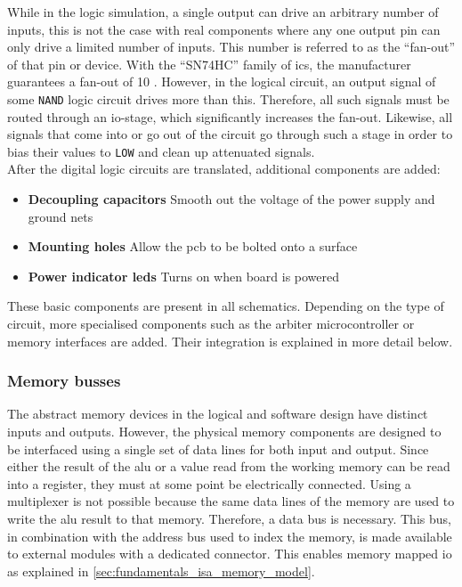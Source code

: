 While in the logic simulation, a single output can drive an arbitrary number of inputs, this is not the case with real components where any one output pin can only drive a limited number of inputs. This number is referred to as the ``fan-out'' of that pin or device. With the ``SN74HC'' family of \acp{ic}, the manufacturer guarantees a fan-out of 10 \cite{ti_sn74hc00}. However, in the logical circuit, an output signal of some \texttt{NAND} logic circuit drives more than this. Therefore, all such signals must be routed through an \ac{io}-stage, which significantly increases the fan-out. Likewise, all signals that come into or go out of the circuit go through such a stage in order to bias their values to \texttt{LOW} and clean up attenuated signals.
\\

After the digital logic circuits are translated, additional components are added:

\begin{itemize}
    \item \textbf{Decoupling capacitors} Smooth out the voltage of the power supply and ground nets
    \item \textbf{Mounting holes} Allow the \ac{pcb} to be bolted onto a surface
    \item \textbf{Power indicator \acp{led}} Turns on when board is powered
\end{itemize}

These basic components are present in all schematics. Depending on the type of circuit, more specialised components such as the arbiter microcontroller or memory interfaces are added. Their integration is explained in more detail below.

\subsubsection{Memory busses}

The abstract memory devices in the logical and software design have distinct inputs and outputs. However, the physical memory components are designed to be interfaced using a single set of data lines for both input and output. Since either the result of the \ac{alu} or a value read from the working memory can be read into a register, they must at some point be electrically connected. Using a multiplexer is not possible because the same data lines of the memory are used to write the \ac{alu} result to that memory. Therefore, a data bus is necessary. This bus, in combination with the address bus used to index the memory, is made available to external modules with a dedicated connector. This enables memory mapped \ac{io} as explained in \autoref{sec:fundamentals_isa_memory_model}. \\

